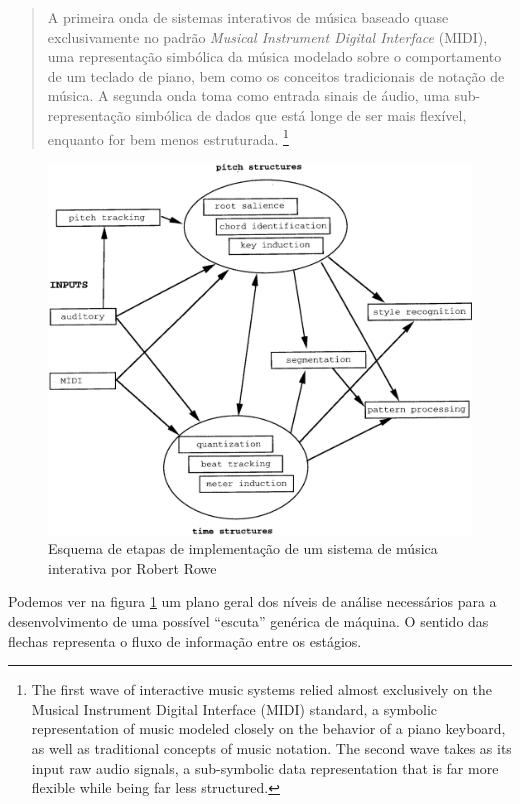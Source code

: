 \documentclass{ppgmus}
\begin{document}
\begin{quote}
A primeira onda de sistemas interativos de música baseado quase exclusivamente no padrão \textit{Musical
Instrument Digital Interface} (MIDI), uma representação simbólica da música modelado
sobre o comportamento de um teclado de piano, bem como os conceitos tradicionais de notação de música.
A segunda onda toma como entrada sinais de áudio, uma sub-representação simbólica de dados que está longe
de ser mais flexível, enquanto for bem menos estruturada. \cite{rowe09:levels}
\footnote{The first wave of interactive music systems relied almost exclusively on the Musical 
Instrument Digital Interface (MIDI) standard, a symbolic representation of music modeled 
closely on the behavior of a piano keyboard, as well as traditional concepts of music notation. 
The second wave takes as its input raw audio signals, a sub-symbolic data representation that is far 
more flexible while being far less structured.}
\end{quote}


\begin{figure}
\includegraphics[scale=.25]{rowe}
\caption{Esquema de etapas de implementação de um sistema de música interativa por Robert Rowe}
\label{rowe}
\end{figure} 


Podemos ver na figura \ref{rowe} um plano geral dos níveis de análise necessários para a desenvolvimento
de uma possível ``escuta'' genérica de máquina. O sentido das flechas representa o fluxo de 
informação entre os estágios.
\end{document}

